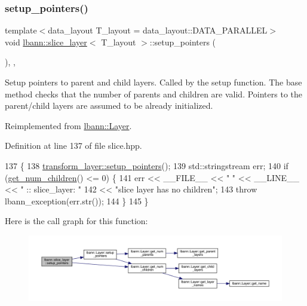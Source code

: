 \subsubsection{\texorpdfstring{setup\+\_\+pointers()}{setup\_pointers()}}
{\footnotesize\ttfamily template$<$data\+\_\+layout T\+\_\+layout = data\+\_\+layout\+::\+D\+A\+T\+A\+\_\+\+P\+A\+R\+A\+L\+L\+EL$>$ \\
void \hyperlink{classlbann_1_1slice__layer}{lbann\+::slice\+\_\+layer}$<$ T\+\_\+layout $>$\+::setup\+\_\+pointers (\begin{DoxyParamCaption}{ }\end{DoxyParamCaption})\hspace{0.3cm}{\ttfamily [inline]}, {\ttfamily [override]}, {\ttfamily [virtual]}}

Setup pointers to parent and child layers. Called by the setup function. The base method checks that the number of parents and children are valid. Pointers to the parent/child layers are assumed to be already initialized. 

Reimplemented from \hyperlink{classlbann_1_1Layer_a71b7a62afd9b73c23b2c0267b8ba0981}{lbann\+::\+Layer}.



Definition at line 137 of file slice.\+hpp.


\begin{DoxyCode}
137                                  \{
138     \hyperlink{classlbann_1_1Layer_a71b7a62afd9b73c23b2c0267b8ba0981}{transform\_layer::setup\_pointers}();
139     std::stringstream err;
140     \textcolor{keywordflow}{if} (\hyperlink{classlbann_1_1Layer_a1409a117c31a7ea4f2c7a4d22a3e86c3}{get\_num\_children}() <= 0) \{
141       err << \_\_FILE\_\_ << \textcolor{stringliteral}{" "} << \_\_LINE\_\_ << \textcolor{stringliteral}{" :: slice\_layer: "}
142           << \textcolor{stringliteral}{"slice layer has no children"};
143       \textcolor{keywordflow}{throw} lbann\_exception(err.str());
144     \}
145   \}
\end{DoxyCode}
Here is the call graph for this function\+:\nopagebreak
\begin{figure}[H]
\begin{center}
\leavevmode
\includegraphics[width=350pt]{classlbann_1_1slice__layer_a701854f5906a25c58d4f9d851b20de29_cgraph}
\end{center}
\end{figure}


